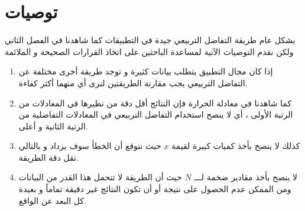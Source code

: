 \chapter*{توصيات }
بشكل عام طريقة التفاضل التربيعي جيدة في التطبيقات كما شاهدنا في الفصل الثاني ولكن نقدم التوصيات الآتية لمساعدة الباحثين على اتخاذ القرارات الصحيحة و الملائمة
\begin{enumerate}
	\item إذا كان مجال التطبيق يتطلب بيانات كثيرة و توجد طريقة أخرى مختلفة عن التفاضل التربيعي يجب مقارنة الطريقتين لنرى أي منهما أكثر كفاءة.
	
	\item كما شاهدنا في معادلة الحرارة فإن النتائج أقل دقة من نظيرها في المعادلات من الرتبة الأولى ، أي لا ينصح استخدام التفاضل التربيعي في المعادلات التفاضلية من الرتبة الثانية و أعلى.
	
	\item كذلك لا ينصح بأخذ كميات كبيرة لقيمة $x$ حيث نتوقع أن الخطأ سوف يزداد و بالتالي تقل دقة الطريقة.
	
	\item لا ينصح بأخذ مقادير ضخمة لـــ $N$ حيث أن الطريقة لا تتحمل هذا القدر من البيانات ومن الممكن عدم الحصول على نتيجة أو أن تكون النتائج غير دقيقة تماماً و بعيدة كل البعد عن الواقع.
\end{enumerate}
